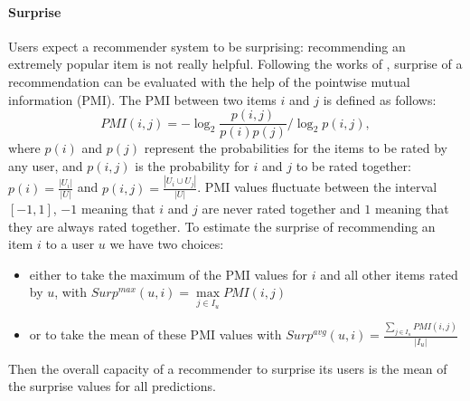 \paragraph{Surprise\\}
Users expect a recommender system to be surprising: recommending an extremely
popular item is not really helpful. Following the works of \cite{KamBriRecSys2014}, surprise of a recommendation can be evaluated with the help of the pointwise mutual
information (PMI). The PMI between two items $i$ and $j$ is defined as follows:
$$PMI(i, j) = -\log_2 \frac{p(i, j)}{p(i)p(j)} / \log_2 p(i, j),$$
where $p(i)$ and $p(j)$  represent the probabilities for the items to be rated
by any user, and $p(i, j)$ is the probability for $i$ and $j$ to be rated
together: $p(i) = \tfrac{|U_i|}{|U|}$ and $p(i, j) = \tfrac{|U_i \cup
U_j|}{|U|}$. PMI values fluctuate between the interval $[-1, 1]$, $-1$ meaning
that $i$ and $j$ are never rated together and $1$ meaning that they are always
rated together. To estimate the surprise of recommending an item $i$ to a user
$u$ we have two choices: 
\begin{itemize}
\item either to take the maximum of the PMI values for $i$ and all
other items rated by $u$, with $Surp^{max}(u, i) = \max\limits_{j\in I_u} PMI(i, j)$
\item
 or to take the mean of these PMI values with $Surp^{avg}(u, i) =
\frac{\sum_{j \in I_u} PMI(i, j)}{|I_u|}$
\end{itemize}
Then the overall capacity of a recommender to surprise its users is the mean of the
surprise values for all predictions.
